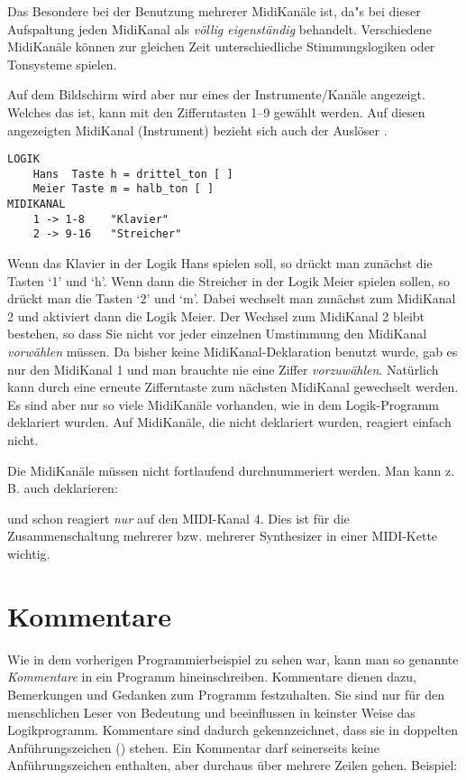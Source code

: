 Das Besondere bei der Benutzung mehrerer MidiKanäle ist, da"s 
\mutabor{} bei dieser Aufspaltung jeden MidiKanal als 
\emph{völlig eigenständig} behandelt. Verschiedene MidiKanäle 
können zur gleichen Zeit unterschiedliche Stimmungslogiken oder 
Tonsysteme spielen.

Auf dem Bildschirm wird aber nur eines der Instrumente/Kanäle
 angezeigt.
Welches das ist, kann mit den Zifferntasten 1--9 gewählt werden.
Auf diesen angezeigten MidiKanal (Instrument) bezieht sich auch der Auslöser
. 
\begin{verbatim}
LOGIK
    Hans  Taste h = drittel_ton [ ]
    Meier Taste m = halb_ton [ ]
MIDIKANAL
    1 -> 1-8    "Klavier"
    2 -> 9-16   "Streicher"
\end{verbatim}
Wenn das Klavier in der Logik Hans spielen soll, so drückt man
zunächst die Tasten `1' und `h'. Wenn dann die Streicher in der 
Logik Meier spielen sollen, so drückt man die Tasten
`2' und `m'. Dabei wechselt man zunächst zum MidiKanal 2
und aktiviert dann die Logik Meier. Der Wechsel zum MidiKanal
2 bleibt bestehen, so dass Sie nicht vor jeder einzelnen Umstimmung
den MidiKanal \emph{vorwählen} müssen. Da bisher keine 
MidiKanal-Deklaration benutzt wurde, gab es nur den MidiKanal 1
und man brauchte nie eine Ziffer \emph{vorzuwählen}.
Natürlich kann durch eine erneute Zifferntaste zum nächsten
MidiKanal
gewechselt werden. Es sind aber nur so viele MidiKanäle
vorhanden, wie in dem Logik-Programm deklariert wurden.
Auf MidiKanäle, die nicht deklariert wurden, reagiert \mutabor{} 
einfach nicht.

Die MidiKanäle müssen nicht fortlaufend durchnummeriert werden.
Man kann z.\,B. auch deklarieren:


und schon reagiert \mutabor{} \emph{nur} auf den MIDI-Kanal 4. Dies ist für die
Zusammenschaltung mehrerer \mutabor{} bzw. mehrerer
Synthesizer in einer MIDI-Kette wichtig.

\chapter{Kommentare}\label{cha:kommentare}

Wie in dem vorherigen Programmierbeispiel zu sehen war, kann man
so genannte \emph{Kommentare} in ein Programm hineinschreiben.
Kommentare dienen dazu, Bemerkungen und Gedanken zum Programm
festzuhalten. Sie sind nur für den menschlichen Leser
von Bedeutung und beeinflussen in keinster Weise das
Logikprogramm. Kommentare sind dadurch gekennzeichnet,
dass sie in doppelten Anführungszeichen (\dq) stehen. Ein Kommentar
darf seinerseits keine Anführungszeichen enthalten, aber durchaus
über mehrere Zeilen gehen. Beispiel:

